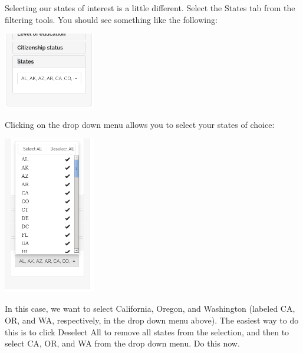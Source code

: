 \documentclass[letterpaper,12pt]{article}
\begin{document}
\begin{enumerate}
  Selecting our states of interest is a little different. Select the
  States tab from the filtering tools. You should see something like
  the following:
  \begin{center}
    \includegraphics[width=0.3\textwidth]{images/trends_ex1/state_selection.png}
  \end{center}
  Clicking on the drop down menu allows you to select your states of
  choice:
  \begin{center}
    \includegraphics[width=0.3\textwidth]{images/trends_ex1/state_drop_down.png}
  \end{center}
  In this case, we want to select California, Oregon, and Washington
  (labeled CA, OR, and WA, respectively, in the drop down menu
  above). The easiest way to do this is to click Deselect All to
  remove all states from the selection, and then to select CA, OR, and
  WA from the drop down menu. Do this now.


\end{enumerate}
\end{document}
